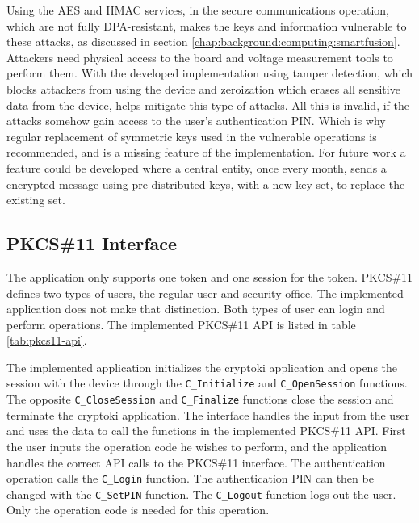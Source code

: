 Using the AES and HMAC services, in the secure communications operation, which are not fully DPA-resistant, makes the keys and information vulnerable to these attacks, as discussed in section \ref{chap:background:computing:smartfusion}.
Attackers need physical access to the board and voltage measurement tools to perform them.
With the developed implementation using tamper detection, which blocks attackers from using the device and zeroization which erases all sensitive data from the device, helps mitigate this type of attacks.
All this is invalid, if the attacks somehow gain access to the user's authentication PIN.
Which is why regular replacement of symmetric keys used in the vulnerable operations is recommended, and is a missing feature of the implementation.
For future work a feature could be developed where a central entity, once every month, sends a encrypted message using pre-distributed keys, with a new key set, to replace the existing set.


\subsection{PKCS\#11 Interface}\label{chap:implementation:app:interface}

The application only supports one token and one session for the token.
PKCS\#11 defines two types of users, the regular user and security office. The implemented application does not make that distinction. Both types of user can login and perform operations.
The implemented PKCS\#11 API is listed in table \ref{tab:pkcs11-api}.

The implemented application initializes the cryptoki application and opens the session with the device through the \texttt{C\_Initialize} and \texttt{C\_OpenSession} functions.
The opposite \texttt{C\_CloseSession} and \texttt{C\_Finalize} functions close the session and terminate the cryptoki application.
The interface handles the input from the user and uses the data to call the functions in the implemented PKCS\#11 API.
First the user inputs the operation code he wishes to perform, and the application handles the correct API calls to the PKCS\#11 interface.
The authentication operation calls the \texttt{C\_Login} function. The authentication PIN can then be changed with the \texttt{C\_SetPIN} function.
The \texttt{C\_Logout} function logs out the user. Only the operation code is needed for this operation.

